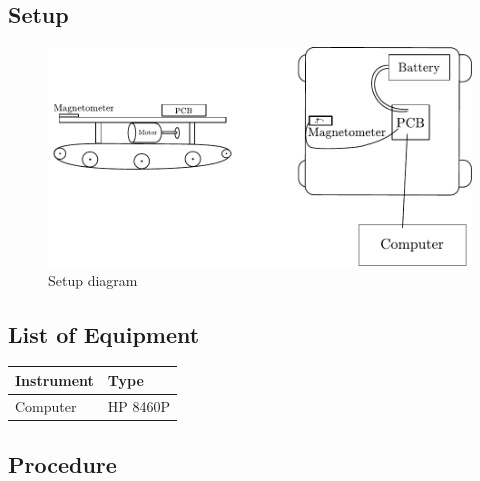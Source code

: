 \subsection{Setup}
\begin{figure}[H]
  \centering
  \includegraphics[scale=0.8]{figures/magnetoCalibSetup.pdf}
  \caption{Setup diagram}
  \label{fig:calibrationSetupDiagram}
\end{figure}

\subsection{List of Equipment}

\begin{table}[H]
\begin{tabular}{|p{10cm}|p{4cm}|}
\hline%
  \textbf{Instrument}                     &  \textbf{Type}       \\
\hline%
  Computer                                &  HP 8460P            \\
\hline %
\end{tabular}
\end{table}

\subsection{Procedure}

